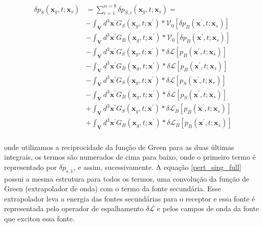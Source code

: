 \begin{eqnarray}
\begin{aligned}
\delta p_{S}\left(\boldsymbol{x}_{g}, t ; \boldsymbol{x}_{s}\right) &=\sum_{i=1}^{n=8} \delta p_{S, i}\left(\boldsymbol{x}_{g}, t ; \boldsymbol{x}_{s}\right)=\\
&-\int_{\mathbf{V}} d^{3} \boldsymbol{x}^{\prime} G_{S}\left(\boldsymbol{x}_{g}, t ; \boldsymbol{x}^{\prime}\right) * \mathcal{V}_{0}\left[\delta p_{B}\left(\boldsymbol{x}^{\prime}, t ; \boldsymbol{x}_{s}\right)\right] \\
&-\int_{\mathbf{V}} d^{3} \boldsymbol{x}^{\prime} G_{B}\left(\boldsymbol{x}_{g}, t ; \boldsymbol{x}^{\prime}\right) * \mathcal{V}_{0}\left[\delta p_{B}\left(\boldsymbol{x}^{\prime}, t ; \boldsymbol{x}_{s}\right)\right] \\
&-\int_{\mathbf{V}} d^{3} \boldsymbol{x}^{\prime} G_{S}\left(\boldsymbol{x}_{g}, t ; \boldsymbol{x}^{\prime}\right) * \delta \mathcal{L}\left[p_{B}\left(\boldsymbol{x}^{\prime}, t ; \boldsymbol{x}_{s}\right)\right] \\
&-\int_{\mathbf{V}} d^{3} \boldsymbol{x}^{\prime} G_{B}\left(\boldsymbol{x}_{g}, t ; \boldsymbol{x}^{\prime}\right) * \delta \mathcal{L}\left[p_{B}\left(\boldsymbol{x}^{\prime}, t ; \boldsymbol{x}_{s}\right)\right] \\
&-\int_{\mathbf{V}} d^{3} \boldsymbol{x}^{\prime} G_{S}\left(\boldsymbol{x}_{g}, t ; \boldsymbol{x}^{\prime}\right) * \delta \mathcal{L}\left[p_{S}\left(\boldsymbol{x}^{\prime}, t ; \boldsymbol{x}_{s}\right)\right] \\
&-\int_{\mathbf{V}} d^{3} \boldsymbol{x}^{\prime} G_{B}\left(\boldsymbol{x}_{g}, t ; \boldsymbol{x}^{\prime}\right) * \delta \mathcal{L}\left[p_{S}\left(\boldsymbol{x}^{\prime}, t ; \boldsymbol{x}_{s}\right)\right] \\
&+\int_{\mathbf{V}} d^{3} \boldsymbol{x}^{\prime} G_{S}\left(\boldsymbol{x}_{g}, t ; \boldsymbol{x}^{\prime}\right) * \delta \mathcal{L}_{B}\left[p_{B}\left(\boldsymbol{x}^{\prime}, t ; \boldsymbol{x}_{s}\right)\right] \\
&+\int_{\mathbf{V}} d^{3} \boldsymbol{x}^{\prime} G_{B}\left(\boldsymbol{x}_{g}, t ; \boldsymbol{x}^{\prime}\right) * \delta \mathcal{L}_{B}\left[p_{B}\left(\boldsymbol{x}^{\prime}, t ; \boldsymbol{x}_{s}\right)\right]
\end{aligned}
\label{pert_sing_full}
\end{eqnarray}
\\
onde utilizamos a reciprocidade da função de Green para as duas últimas integrais, os termos são numerados de cima para baixo, onde o primeiro termo é representado por $\delta p_{s,1}$, e assim, sucessivamente. A equação \ref{pert_sing_full} possui a mesma estrutura para todos os termos, uma convolução da função de Green (extrapolador de onda) com o termo da fonte secundária. Esse extrapolador leva a energia das fontes secundárias para o receptor e essa fonte é representada pelo operador de espalhamento $\delta \mathcal{L}$ e pelos campos de onda da fonte que excitou essa fonte.   
